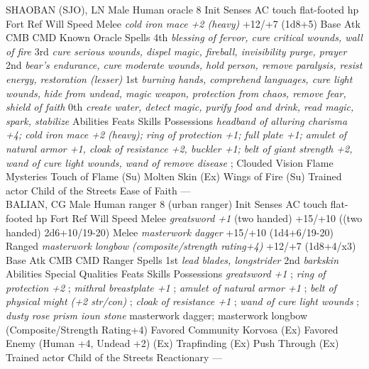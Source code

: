 SHAOBAN (SJO), LN Male Human oracle 8  Init Senses  AC touch flat-footed  hp  Fort Ref Will  Speed  Melee  {\itshape cold iron mace +2 (heavy)} +12/+7 (1d8+5)  Base Atk CMB CMD  Known Oracle Spells  4th  {\itshape blessing of fervor, cure critical wounds, wall of fire}   3rd  {\itshape cure serious wounds, dispel magic, fireball, invisibility purge, prayer}   2nd  {\itshape bear's endurance, cure moderate wounds, hold person, remove paralysis, resist energy, restoration (lesser)}   1st  {\itshape burning hands, comprehend languages, cure light wounds, hide from undead, magic weapon, protection from chaos, remove fear, shield of faith}   0th  {\itshape create water, detect magic, purify food and drink, read magic, spark, stabilize}   Abilities  Feats  Skills  Possessions  {\itshape headband of alluring charisma +4; cold iron mace +2 (heavy); ring of protection +1; full plate +1; amulet of natural armor +1, cloak of resistance +2, buckler +1; belt of giant strength +2, wand of cure light wounds, wand of remove disease} ; Clouded Vision  Flame Mysteries  Touch of Flame (Su)   Molten Skin (Ex)  Wings of Fire (Su) Trained actor  Child of the Streets  Ease of Faith ---\\

BALIAN, CG Male Human ranger 8 (urban ranger)  Init Senses  AC touch flat-footed  hp  Fort Ref Will  Speed  Melee  {\itshape greatsword +1} (two handed) +15/+10 ((two handed) 2d6+10/19-20)  Melee  {\itshape masterwork dagger} +15/+10 (1d4+6/19-20)  Ranged  {\itshape masterwork longbow (composite/strength rating+4)} +12/+7 (1d8+4/x3)  Base Atk CMB CMD  Ranger Spells  1st  {\itshape lead blades, longstrider}   2nd  {\itshape barkskin}   Abilities  Special Qualities  Feats  Skills  Possessions  {\itshape greatsword +1} ;  {\itshape ring of protection +2} ;  {\itshape mithral breastplate +1} ;  {\itshape amulet of natural armor +1} ;  {\itshape belt of physical might (+2 str/con)} ;  {\itshape cloak of resistance +1} ;  {\itshape wand of cure light wounds} ;  {\itshape dusty rose prism ioun stone} masterwork dagger; masterwork longbow (Composite/Strength Rating+4)  Favored Community Korvosa (Ex)  Favored Enemy (Human +4, Undead +2) (Ex)  Trapfinding (Ex)  Push Through (Ex) Trained actor  Child of the Streets  Reactionary ---\\

